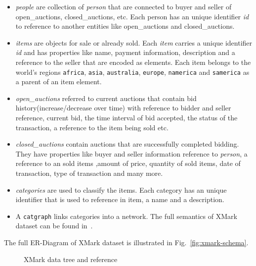 \begin{itemize}	
	\item
		\textit{people} are collection of \textit{person} that are connected to buyer and seller of open\_auctions, closed\_auctions, etc. Each person has an unique identifier \textit{id} to reference to another entities like open\_auctions and closed\_auctions.
	\item
		\textit{items} are objects for sale or already sold. Each \textit{item} carries a unique identifier \textit{id} and has properties like name, payment information, description and a reference to the seller that are encoded as elements. Each item belongs to the world's regions \texttt{africa}, \texttt{asia}, \texttt{australia}, \texttt{europe}, \texttt{namerica} and \texttt{samerica} as a parent of an item element.
	\item
		\textit{open\_auctions} referred to current auctions that contain bid history(increase/decrease over time) with reference to bidder and seller reference, current bid, the time interval of bid accepted, the status of the transaction, a reference to the item being sold etc.
	\item
		\textit{closed\_auctions} contain auctions that are successfully completed bidding. They have properties like buyer and seller information reference to \textit{person}, a reference to an sold items ,amount of price, quantity of sold items, date of transaction, type of transaction and many more.
	\item 
		\textit{categories} are used to classify the items. Each category has an unique identifier that is used to reference in item, a name and a description.
	\item
		  A \texttt{catgraph} links categories into a network.  The full semantics of XMark dataset can be found in~\cite{xmark/original}.
\end{itemize}
The full ER-Diagram of XMark dataset is illustrated in Fig.~\ref{fig:xmark-schema}. 
\begin{figure}[H]
	\centering
	\centering
	\caption{XMark data tree and reference~\citep{xmark/original}}
	\label{fig:xmark-tree-reference}
\end{figure}
